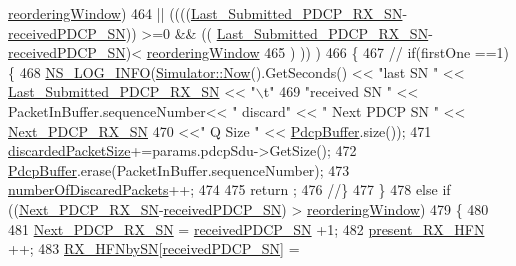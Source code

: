 \begin{DoxyCode}
{      \hyperlink{classns3_1_1McUePdcp_a6d90ca416e1c78dd78f4d530e64b4be0}{reorderingWindow})
464       || ((((\hyperlink{classns3_1_1McUePdcp_a3706f4ac613b70145c22b7b03649db6b}{Last\_Submitted\_PDCP\_RX\_SN}-\hyperlink{classns3_1_1McUePdcp_a87a21da01ea037ef1146091164f1f3f5}{receivedPDCP\_SN})) >=0 && ((
      \hyperlink{classns3_1_1McUePdcp_a3706f4ac613b70145c22b7b03649db6b}{Last\_Submitted\_PDCP\_RX\_SN}-\hyperlink{classns3_1_1McUePdcp_a87a21da01ea037ef1146091164f1f3f5}{receivedPDCP\_SN})< 
      \hyperlink{classns3_1_1McUePdcp_a6d90ca416e1c78dd78f4d530e64b4be0}{reorderingWindow}
465                  ) )) )
466   \{
467         \textcolor{comment}{// if(firstOne ==1)\{}
468     \hyperlink{group__logging_gafbd73ee2cf9f26b319f49086d8e860fb}{NS\_LOG\_INFO}(\hyperlink{classns3_1_1Simulator_ac3178fa975b419f7875e7105be122800}{Simulator::Now}().GetSeconds() << \textcolor{stringliteral}{"last SN "} << 
      \hyperlink{classns3_1_1McUePdcp_a3706f4ac613b70145c22b7b03649db6b}{Last\_Submitted\_PDCP\_RX\_SN} << \textcolor{stringliteral}{"\(\backslash\)t"}
469                 \textcolor{stringliteral}{"received SN "}  << PacketInBuffer.sequenceNumber<< \textcolor{stringliteral}{" discard"} << \textcolor{stringliteral}{"  Next PDCP SN  "} << 
      \hyperlink{classns3_1_1McUePdcp_aea27a607c319349dabbf1fba9a9a2efc}{Next\_PDCP\_RX\_SN}
470                                 <<\textcolor{stringliteral}{"   Q Size "} << \hyperlink{classns3_1_1McUePdcp_aaca29474fb58d037d727e503c44490b5}{PdcpBuffer}.size());
471     \hyperlink{classns3_1_1McUePdcp_ae7935800f033c5e63ec66e18c6c91776}{discardedPacketSize}+=params.pdcpSdu->GetSize();
472     \hyperlink{classns3_1_1McUePdcp_aaca29474fb58d037d727e503c44490b5}{PdcpBuffer}.erase(PacketInBuffer.sequenceNumber);
473     \hyperlink{classns3_1_1McUePdcp_a2d97086fdd2e34fb5543e9599725b087}{numberOfDiscaredPackets}++;
474 
475     return ;
476          \textcolor{comment}{//\}}
477   \}
478   \textcolor{keywordflow}{else} \textcolor{keywordflow}{if} ((\hyperlink{classns3_1_1McUePdcp_aea27a607c319349dabbf1fba9a9a2efc}{Next\_PDCP\_RX\_SN}-\hyperlink{classns3_1_1McUePdcp_a87a21da01ea037ef1146091164f1f3f5}{receivedPDCP\_SN}) > 
      \hyperlink{classns3_1_1McUePdcp_a6d90ca416e1c78dd78f4d530e64b4be0}{reorderingWindow})
479   \{
480 
481           \hyperlink{classns3_1_1McUePdcp_aea27a607c319349dabbf1fba9a9a2efc}{Next\_PDCP\_RX\_SN} = \hyperlink{classns3_1_1McUePdcp_a87a21da01ea037ef1146091164f1f3f5}{receivedPDCP\_SN} +1;
482           \hyperlink{classns3_1_1McUePdcp_a994b45ad9bc4a84147d8ba3bc2350941}{present\_RX\_HFN} ++;
483               \hyperlink{classns3_1_1McUePdcp_aeb903cf6e9c21639ec4c447cc63f91c3}{RX\_HFNbySN}[\hyperlink{classns3_1_1McUePdcp_a87a21da01ea037ef1146091164f1f3f5}{receivedPDCP\_SN}] = 
}
\end{DoxyCode}
